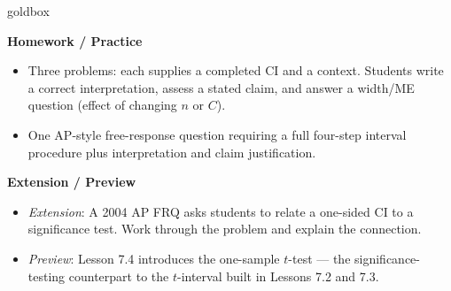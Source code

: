\documentclass[10pt]{article}
\begin{document}
\begin{skillbox}{goldbox}
\begin{minipage}[t]{0.48\linewidth}
    \textbf{Homework / Practice}
    \begin{itemize}
        \item Three problems: each supplies a completed CI and a context. Students
              write a correct interpretation, assess a stated claim, and answer a
              width/ME question (effect of changing $n$ or $C$).
        \item One AP-style free-response question requiring a full four-step interval
              procedure plus interpretation and claim justification.
    \end{itemize}
\end{minipage}
\hfill
\begin{minipage}[t]{0.48\linewidth}
    \textbf{Extension / Preview}
    \begin{itemize}
        \item \textit{Extension}: A 2004 AP FRQ asks students to relate a one-sided
              CI to a significance test. Work through the problem and explain the
              connection.
        \item \textit{Preview}: Lesson 7.4 introduces the one-sample $t$-test ---
              the significance-testing counterpart to the $t$-interval built in
              Lessons 7.2 and 7.3.
    \end{itemize}
\end{minipage}
\end{skillbox}
\end{document}
